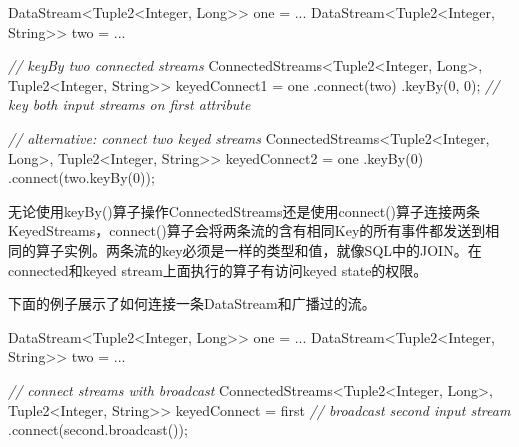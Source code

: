 \documentclass[cn,11pt,chinese]{elegantbook}
\newenvironment{Shaded}{}{}
\newcommand{\BuiltInTok}[1]{#1}
\newcommand{\CommentTok}[1]{\textcolor[rgb]{0.38,0.63,0.69}{\textit{#1}}}
\newcommand{\DecValTok}[1]{\textcolor[rgb]{0.25,0.63,0.44}{#1}}
\newcommand{\FunctionTok}[1]{\textcolor[rgb]{0.02,0.16,0.49}{#1}}
\newcommand{\NormalTok}[1]{#1}
\begin{document}
\begin{Shaded}
\begin{Highlighting}[]
\NormalTok{DataStream\textless{}Tuple2\textless{}}\BuiltInTok{Integer}\NormalTok{, }\BuiltInTok{Long}\NormalTok{\textgreater{}\textgreater{} one = ...}
\NormalTok{DataStream\textless{}Tuple2\textless{}}\BuiltInTok{Integer}\NormalTok{, }\BuiltInTok{String}\NormalTok{\textgreater{}\textgreater{} two = ...}

\CommentTok{// keyBy two connected streams}
\NormalTok{ConnectedStreams\textless{}Tuple2\textless{}}\BuiltInTok{Integer}\NormalTok{, }\BuiltInTok{Long}\NormalTok{\textgreater{}, Tuple2\textless{}}\BuiltInTok{Integer}\NormalTok{, }\BuiltInTok{String}\NormalTok{\textgreater{}\textgreater{} keyedConnect1 = one}
\NormalTok{  .}\FunctionTok{connect}\NormalTok{(two)}
\NormalTok{  .}\FunctionTok{keyBy}\NormalTok{(}\DecValTok{0}\NormalTok{, }\DecValTok{0}\NormalTok{); }\CommentTok{// key both input streams on first attribute}

\CommentTok{// alternative: connect two keyed streams}
\NormalTok{ConnectedStreams\textless{}Tuple2\textless{}}\BuiltInTok{Integer}\NormalTok{, }\BuiltInTok{Long}\NormalTok{\textgreater{}, Tuple2\textless{}}\BuiltInTok{Integer}\NormalTok{, }\BuiltInTok{String}\NormalTok{\textgreater{}\textgreater{} keyedConnect2 = one}
\NormalTok{  .}\FunctionTok{keyBy}\NormalTok{(}\DecValTok{0}\NormalTok{)}
\NormalTok{  .}\FunctionTok{connect}\NormalTok{(two.}\FunctionTok{keyBy}\NormalTok{(}\DecValTok{0}\NormalTok{));}
\end{Highlighting}
\end{Shaded}

无论使用keyBy()算子操作ConnectedStreams还是使用connect()算子连接两条KeyedStreams，connect()算子会将两条流的含有相同Key的所有事件都发送到相同的算子实例。两条流的key必须是一样的类型和值，就像SQL中的JOIN。在connected和keyed
stream上面执行的算子有访问keyed state的权限。

下面的例子展示了如何连接一条DataStream和广播过的流。

\begin{Shaded}
\begin{Highlighting}[]
\NormalTok{DataStream\textless{}Tuple2\textless{}}\BuiltInTok{Integer}\NormalTok{, }\BuiltInTok{Long}\NormalTok{\textgreater{}\textgreater{} one = ...}
\NormalTok{DataStream\textless{}Tuple2\textless{}}\BuiltInTok{Integer}\NormalTok{, }\BuiltInTok{String}\NormalTok{\textgreater{}\textgreater{} two = ...}

\CommentTok{// connect streams with broadcast}
\NormalTok{ConnectedStreams\textless{}Tuple2\textless{}}\BuiltInTok{Integer}\NormalTok{, }\BuiltInTok{Long}\NormalTok{\textgreater{}, Tuple2\textless{}}\BuiltInTok{Integer}\NormalTok{, }\BuiltInTok{String}\NormalTok{\textgreater{}\textgreater{} keyedConnect = first}
  \CommentTok{// broadcast second input stream}
\NormalTok{  .}\FunctionTok{connect}\NormalTok{(second.}\FunctionTok{broadcast}\NormalTok{());}
\end{Highlighting}
\end{Shaded}
\end{document}
